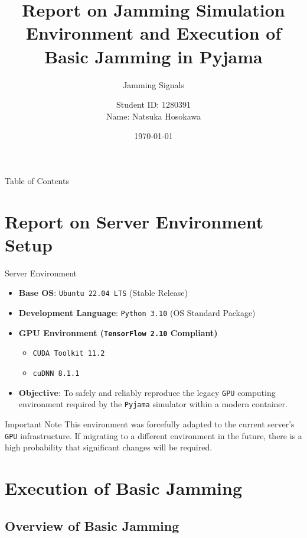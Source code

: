 \documentclass[11pt, aspectratio=169]{beamer}
\title{Report on Jamming Simulation Environment and Execution of Basic Jamming in Pyjama}
\subtitle{Jamming Signals}
\author{Student ID: 1280391 \\ Name: Natsuka Hosokawa}
\institute{Kochi University of Technology}
\date{\today}
\begin{document}
\begin{frame}
  \titlepage
\end{frame}

\begin{frame}{Table of Contents}
  \tableofcontents
\end{frame}


\section{Report on Server Environment Setup}

\begin{frame}{Server Environment}
  \begin{itemize}
    \item \textbf{Base OS}: \texttt{Ubuntu 22.04 LTS} (Stable Release)
    \item \textbf{Development Language}: \texttt{Python 3.10} (OS Standard Package)
    \item \textbf{GPU Environment (\texttt{TensorFlow 2.10} Compliant)}
    \begin{itemize}
      \item \texttt{CUDA Toolkit 11.2}
      \item \texttt{cuDNN 8.1.1}
    \end{itemize}
    \item \textbf{Objective}: To safely and reliably reproduce the legacy \texttt{GPU} computing environment required by the \texttt{Pyjama} simulator within a modern container.
  \end{itemize}
  \begin{alertblock}{Important Note}
    This environment was forcefully adapted to the current server's \texttt{GPU} infrastructure. If migrating to a different environment in the future, there is a high probability that significant changes will be required.
    \end{alertblock}
\end{frame}

\section{Execution of Basic Jamming}

\subsection{Overview of Basic Jamming}
\end{document}
